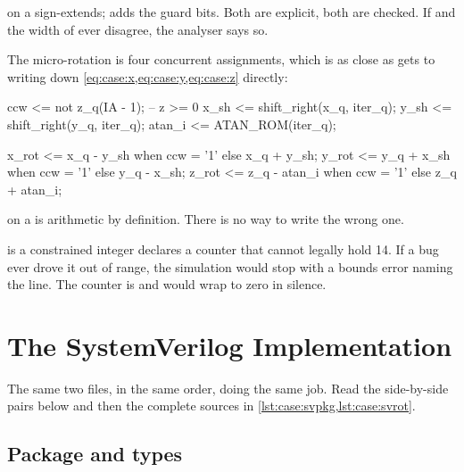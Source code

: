  on a  sign-extends;  adds the
guard bits. Both are explicit, both are checked. If  and the width
of  ever disagree, the analyser says so.

The micro-rotation is four concurrent assignments, which is as close as
\VHDL{} gets to writing down \cref{eq:case:x,eq:case:y,eq:case:z} directly:

\begin{vhdlcode}
ccw    <= not z_q(IA - 1);            -- z >= 0
x_sh   <= shift_right(x_q, iter_q);
y_sh   <= shift_right(y_q, iter_q);
atan_i <= ATAN_ROM(iter_q);

x_rot <= x_q - y_sh   when ccw = '1' else x_q + y_sh;
y_rot <= y_q + x_sh   when ccw = '1' else y_q - x_sh;
z_rot <= z_q - atan_i when ccw = '1' else z_q + atan_i;
\end{vhdlcode}

 on a  is arithmetic by definition. There is
no way to write the wrong one.

\begin{notebox}{ is a constrained integer}
 declares a counter that
cannot legally hold 14. If a bug ever drove it out of range, the simulation
would stop with a bounds error naming the line. The \SV{} counter is
 and would wrap to zero in silence.
\end{notebox}

\clearpage
{}

\clearpage
{}

\clearpage
\section{The SystemVerilog Implementation}
\label{sec:case:sv}

The same two files, in the same order, doing the same job. Read the
side-by-side pairs below and then the complete sources in
\cref{lst:case:svpkg,lst:case:svrot}.

\subsection{Package and types}

